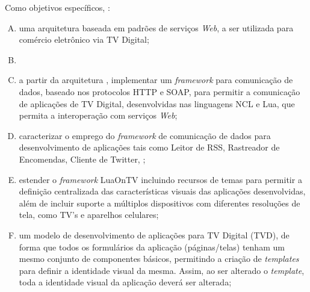 Como objetivos específicos, :
\begin{enumerate}[A)]
  \item {}  
  uma arquitetura baseada em padrões de serviços \textit{Web}, a ser utilizada para comércio eletrônico via TV Digital;
  
  \item {}
  
	\item a partir da arquitetura , implementar um \textit{framework} para comunicação de dados, baseado nos protocolos HTTP e SOAP,
	para permitir a comunicação de aplicações de TV Digital, desenvolvidas nas linguagens NCL e Lua,
	que permita a interoperação com serviços \textit{Web};
	
  \item caracterizar o emprego do \textit{framework} de comunicação de dados para desenvolvimento de aplicações
  tais como Leitor de RSS, Rastreador de Encomendas, Cliente de Twitter, ;
	
	\item estender o \textit{framework} LuaOnTV\cite{junior2009luacomp} incluindo recursos
	de temas para permitir a definição centralizada das características visuais das aplicações
	desenvolvidas, além de incluir suporte a múltiplos dispositivos com diferentes resoluções
	de tela, como TV's e aparelhos celulares;
	
	\item {}um modelo de desenvolvimento de aplicações para TV Digital (TVD), de forma 
  que todos os formulários da aplicação (páginas/telas) tenham um mesmo
  conjunto de componentes básicos, permitindo a criação de \textit{templates} para definir a identidade
  visual da mesma. Assim, ao ser alterado o \textit{template}, toda
  a identidade visual da aplicação deverá ser alterada;
  
\end{enumerate}


